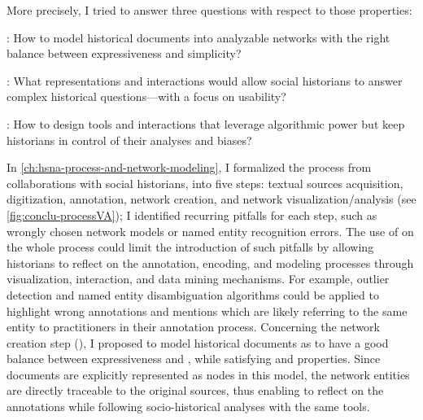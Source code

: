 More precisely, I tried to answer three questions with respect to those properties:
\begin{description}
    \item \qone: How to model historical documents into analyzable networks with the right balance between expressiveness and simplicity?
    \item \qtwo: What representations and interactions would allow social historians to answer complex historical questions---with a focus on usability?
    \item \qthree: How to design \va tools and interactions that leverage algorithmic power but keep historians in control of their analyses and biases?
\end{description}

In \autoref{ch:hsna-process-and-network-modeling}, I formalized the \hsna process from collaborations with social historians, into five steps: textual sources acquisition, digitization, annotation, network creation, and network visualization/analysis (see \autoref{fig:conclu-processVA}); I identified recurring pitfalls for each step, such as wrongly chosen network models or named entity recognition errors.
The use of \va on the whole process could limit the introduction of such pitfalls by allowing historians to reflect on the annotation, encoding, and modeling processes through visualization, interaction, and data mining mechanisms.
For example, outlier detection and named entity disambiguation algorithms could be applied to highlight wrong annotations and mentions which are likely referring to the same entity to practitioners in their annotation process.
Concerning the network creation step (\qone), I proposed to model historical documents as \modelplural to have a good balance between expressiveness and \simplicity, while satisfying \traceability and \reality properties.
Since documents are explicitly represented as nodes in this model, the network entities are directly traceable to the original sources, thus enabling to reflect on the annotations while following socio-historical analyses with the same tools.

